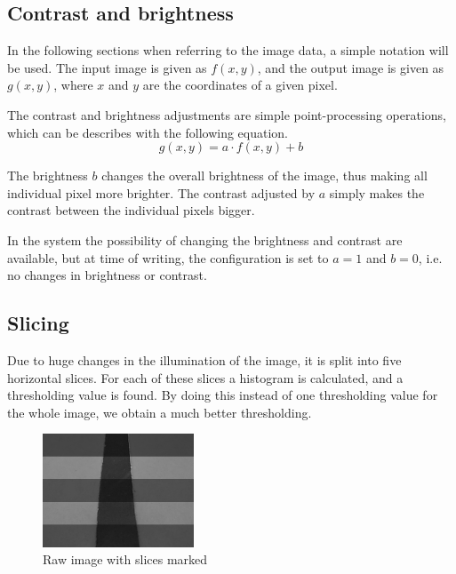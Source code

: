 %
%
%
%
\subsection{Contrast and brightness}

In the following sections when referring to the image data, a simple notation will be used. The input image is given as $f(x,y)$, and the output image is given as $g(x,y)$, where $x$ and $y$ are the coordinates of a given pixel. 

The contrast and brightness adjustments are simple point-processing operations, which can be describes with the following equation.
\begin{equation}
	g(x,y) = a \cdot f(x,y) + b
\end{equation}

The brightness $b$ changes the overall brightness of the image, thus making all individual pixel more brighter. The contrast adjusted by $a$ simply makes the contrast between the individual pixels bigger.

In the system the possibility of changing the brightness and contrast are available, but at time of writing, the configuration is set to $a = 1$ and $b = 0$, i.e. no changes in brightness or contrast.


%
%
%
%
\subsection{Slicing}

Due to huge changes in the illumination of the image, it is split into five horizontal slices. For each of these slices a histogram is calculated, and a thresholding value is found. By doing this instead of one thresholding value for the whole image, we obtain a much better thresholding. 

\begin{figure}[!ht]
	\centering
	\includegraphics[width=0.4\textwidth]{resources/img-line-straight-raw-sliced}
	\caption{Raw image with slices marked}
	\label{fig:camera_2}
\end{figure}


